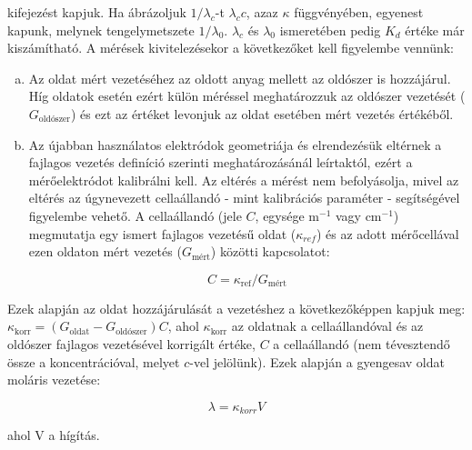 kifejezést kapjuk.
Ha ábrázoljuk $1/\lambda_c$-t $\lambda_c c$, azaz $\kappa$ függvényében, egyenest kapunk, melynek tengelymetszete $1/\lambda_0$. $\lambda_c$ és $\lambda_0$ ismeretében pedig $K_d$ értéke már kiszámítható.
A mérések kivitelezésekor a következőket kell figyelembe vennünk:
\begin{enumerate}[(a)]
\item Az oldat mért vezetéséhez az oldott anyag mellett az oldószer is hozzájárul.
Híg oldatok esetén ezért külön méréssel meghatározzuk az oldószer vezetését ($G_{\text{oldószer}}$) és ezt az értéket levonjuk az oldat esetében mért vezetés értékéből.

\item Az újabban használatos elektródok geometriája és elrendezésük eltérnek a fajlagos vezetés definíció szerinti meghatározásánál leírtaktól, ezért a mérőelektródot kalibrálni kell.
Az eltérés a mérést nem befolyásolja, mivel az eltérés az úgynevezett cellaállandó - mint kalibrációs paraméter - segítségével figyelembe vehető.
A cellaállandó (jele $C$, egysége m$^{-1}$ vagy cm$^{-1}$) megmutatja egy ismert fajlagos vezetésű oldat ($\kappa_{ref}$) és az adott mérőcellával ezen oldaton mért vezetés ($G_{\text{mért}}$) közötti kapcsolatot:

\begin{equation}
\label{eq:c}
	C
	=
	\kappa_{\text{ref}}/G_{\text{mért}}
\end{equation}

\end{enumerate}

Ezek alapján az oldat hozzájárulását a vezetéshez a következőképpen kapjuk meg: $\kappa_{\text{korr}} = (G_{\text{oldat}} - G_{\text{oldószer}})C$,
ahol $\kappa_{\text{korr}}$ az oldatnak a cellaállandóval és az oldószer fajlagos vezetésével korrigált értéke, $C$ a cellaállandó (nem tévesztendő össze a koncentrációval, melyet $c$-vel jelölünk).
Ezek alapján a gyengesav oldat moláris vezetése:

\begin{equation}
\label{eq:c}
        \lambda
        =
        \kappa_{korr}
	V
\end{equation}

ahol V a hígítás.

